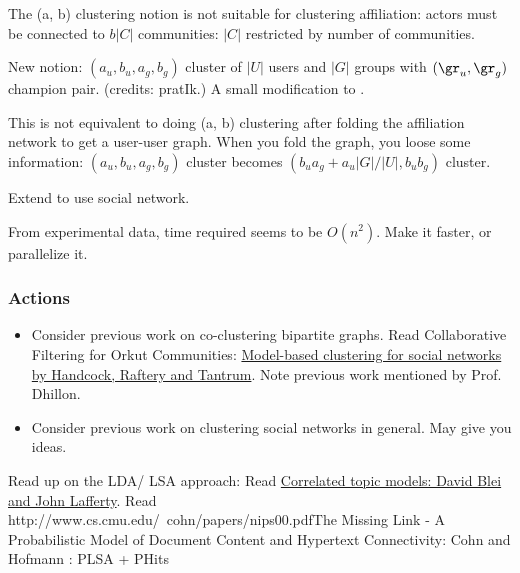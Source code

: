 \documentclass{article}
\begin{document}
The (a, b) clustering notion is not suitable for clustering affiliation: actors must be connected to $b|C|$ communities: $|C|$ restricted by number of communities.

New notion: $(a_{u}, b_{u}, a_{g}, b_{g})$ cluster of $|U|$ users and $|G|$ groups with $(\gr_{u}, \gr_{g})$ champion pair. (credits: pratIk.) A small modification to .

This is not equivalent to doing (a, b) clustering after folding the affiliation network to get a user-user graph. When you fold the graph, you loose some information: $(a_{u}, b_{u}, a_{g}, b_{g})$ cluster becomes $(b_u a_g +a_{u}|G|/|U|, b_{u}b_{g})$ cluster.

Extend to use social network.

From experimental data, time required seems to be $O(n^{2})$. Make it faster, or parallelize it.

\subsubsection{Actions}
\begin{itemize}
 \item Consider previous work on co-clustering bipartite graphs.
 \subitem Read Collaborative Filtering for Orkut Communities: \href{http://www.stat.washington.edu/raftery/Research/PDF/Handcock2007.pdf}{Model-based clustering for social networks by Handcock, Raftery and Tantrum}.
 \subitem Note previous work mentioned by Prof. Dhillon.

 \item Consider previous work on clustering social networks in general. May give you ideas.
\end{itemize}

Read up on the LDA/ LSA approach:
 \subitem Read \href{http://www.cs.cmu.edu/~lafferty/pub/ctm.pdf}{Correlated topic models: David Blei and John Lafferty}.
 \subitem Read \\
{http://www.cs.cmu.edu/~cohn/papers/nips00.pdf}{The Missing Link - A Probabilistic Model of Document Content and Hypertext Connectivity: Cohn and Hofmann} : PLSA + PHits
\end{document}
